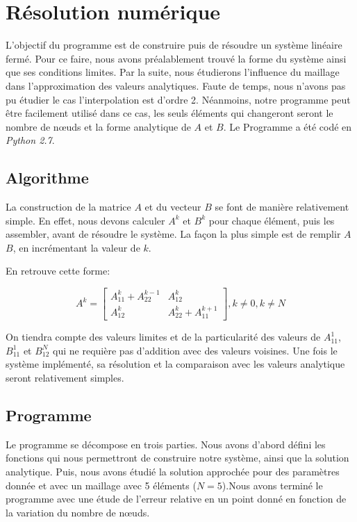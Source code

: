 \documentclass[a4paper,10pt]{report} %
\begin{document}
\chapter{Résolution numérique} %

L'objectif du programme est de construire puis de résoudre un système linéaire fermé. Pour ce faire, nous avons préalablement trouvé la forme du système ainsi que ses conditions limites.
Par la suite, nous étudierons l'influence du maillage dans l'approximation des valeurs analytiques. Faute de temps, nous n'avons pas pu étudier le cas l'interpolation est d'ordre 2. Néanmoins, notre programme peut être facilement utilisé dans ce cas, les seuls éléments qui changeront seront le nombre de nœuds et la forme analytique de $A$ et $B$.
Le Programme a été codé en \textit{Python 2.7}.


\section{Algorithme}

La construction de la matrice $A$ et du vecteur $B$ se font de manière relativement simple. En effet, nous devons calculer $A^k$ et $B^k$ pour chaque élément, puis les assembler, avant de résoudre le système.
La façon la plus simple est de remplir $A$ $B$, en incrémentant la valeur de $k$.

En retrouve cette forme:

$$A^k =\begin{bmatrix}
A^k_11 + A^{k-1}_22 & A^k_12 \\
A^k_12 & A^k_22 + A^{k+1}_11
\end{bmatrix}, k \neq 0, k \neq N$$

On tiendra compte des valeurs limites et de la particularité des valeurs de $A^1_{11}$,$B^1_{11}$ et $B^N_{12}$ qui ne requière pas d'addition avec des valeurs voisines.
Une fois le système implémenté, sa résolution et la comparaison avec les valeurs analytique seront relativement simples.

\section{Programme}

Le programme se décompose en trois parties. Nous avons d'abord défini les fonctions qui nous permettront de construire notre système, ainsi que la solution analytique. Puis, nous avons étudié la solution approchée pour des paramètres donnée et avec un maillage avec 5 éléments ($N=5$).Nous avons terminé le programme avec une étude de l'erreur relative en un point donné en fonction de la variation du nombre de nœuds.
\end{document}
